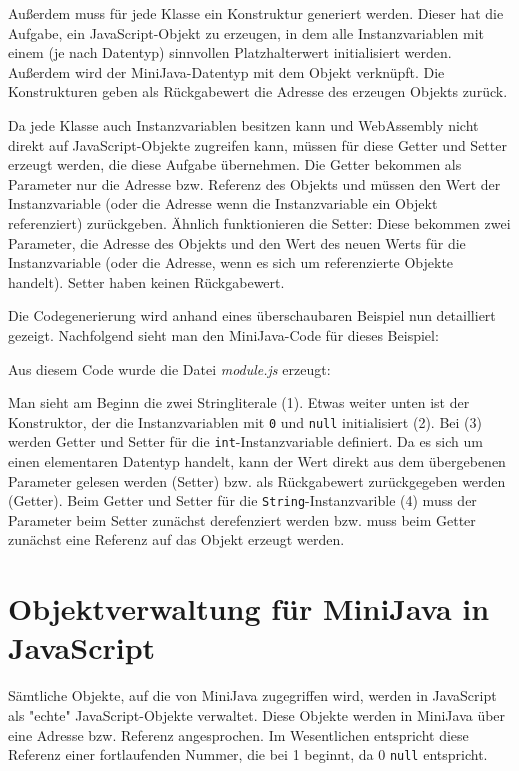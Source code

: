 Außerdem muss für jede Klasse ein Konstruktur generiert werden. Dieser hat die Aufgabe, ein JavaScript-Objekt zu erzeugen, in dem alle Instanzvariablen mit einem (je nach Datentyp) sinnvollen Platzhalterwert initialisiert werden. Außerdem wird der MiniJava-Datentyp mit dem Objekt verknüpft. Die Konstrukturen geben als Rückgabewert die Adresse des erzeugen Objekts zurück.

Da jede Klasse auch Instanzvariablen besitzen kann und WebAssembly nicht direkt auf JavaScript-Objekte zugreifen kann, müssen für diese Getter und Setter erzeugt werden, die diese Aufgabe übernehmen. Die Getter bekommen als Parameter nur die Adresse bzw. Referenz des Objekts und müssen den Wert der Instanzvariable (oder die Adresse wenn die Instanzvariable ein Objekt referenziert) zurückgeben. Ähnlich funktionieren die Setter: Diese bekommen zwei Parameter, die Adresse des Objekts und den Wert des neuen Werts für die Instanzvariable (oder die Adresse, wenn es sich um referenzierte Objekte handelt). Setter haben keinen Rückgabewert.

Die Codegenerierung wird anhand eines überschaubaren Beispiel nun detailliert gezeigt. Nachfolgend sieht man den MiniJava-Code für dieses Beispiel:



Aus diesem Code wurde die Datei \emph{module.js} erzeugt:



Man sieht am Beginn die zwei Stringliterale (1). Etwas weiter unten ist der Konstruktor, der die Instanzvariablen mit \lstinline{0} und \lstinline{null} initialisiert (2). Bei (3) werden Getter und Setter für die \lstinline{int}-Instanzvariable definiert. Da es sich um einen elementaren Datentyp handelt, kann der Wert direkt aus dem übergebenen Parameter gelesen werden (Setter) bzw. als Rückgabewert zurückgegeben werden (Getter). Beim Getter und Setter für die \lstinline{String}-Instanzvarible (4) muss der Parameter beim Setter zunächst derefenziert werden bzw. muss beim Getter zunächst eine Referenz auf das Objekt erzeugt werden.

\section{Objektverwaltung für MiniJava in JavaScript}

Sämtliche Objekte, auf die von MiniJava zugegriffen wird, werden in JavaScript als "echte" JavaScript-Objekte verwaltet. Diese Objekte werden in MiniJava über eine Adresse bzw. Referenz angesprochen. Im Wesentlichen entspricht diese Referenz einer fortlaufenden Nummer, die bei 1 beginnt, da 0 \lstinline{null} entspricht.

